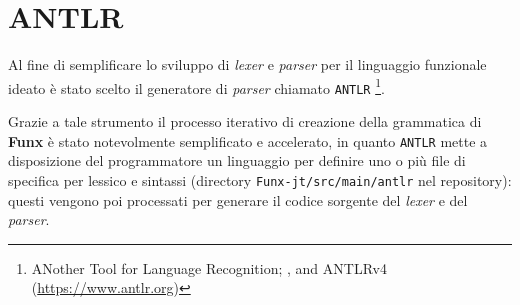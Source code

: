 \section{ANTLR}
\label{sec:5-1-antlr}

Al fine di semplificare lo sviluppo di \textit{lexer} e \textit{parser} per il linguaggio funzionale ideato
è stato scelto il generatore di \textit{parser} chiamato \texttt{ANTLR}%
\footnote{ANother Tool for Language Recognition;
     \cite{Parr-1995-ANTLRGenerator},
     \cite{Parr-2013-DefinitiveANTLR}
    and ANTLRv4 (\url{https://www.antlr.org})}.

\noindent Grazie a tale strumento il processo iterativo di creazione della grammatica di \textbf{Funx}
è stato notevolmente semplificato e accelerato, in quanto \texttt{ANTLR} mette a disposizione del programmatore
un linguaggio per definire uno o più file di specifica per lessico e sintassi
(directory \texttt{Funx-jt/src/main/antlr} nel repository): questi vengono poi processati
per generare il codice sorgente del \textit{lexer} e del \textit{parser}.



